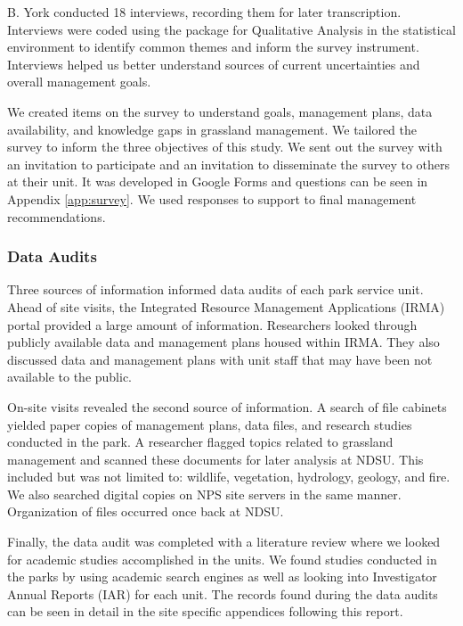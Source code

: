 B. York conducted 18 interviews, recording them for later transcription.
Interviews were coded using the  package for Qualitative Analysis in the \R statistical environment  \citep{rcoreteam2017,huang2018} to identify common themes and inform the survey instrument.
Interviews helped us better understand sources of current uncertainties and overall management goals.

We created items on the survey to understand goals, management plans, data availability, and knowledge gaps in grassland management. 
We tailored the survey to inform the three objectives of this study. 
We sent out the survey with an invitation to participate and an invitation to disseminate the survey to others at their unit. 
It was developed in Google Forms and questions can be seen in Appendix \ref{app:survey}. 
We used responses to support to final management recommendations.

\subsubsection{Data Audits} 
Three sources of information informed data audits of each park service unit. 
Ahead of site visits, the Integrated Resource Management Applications (IRMA) portal provided a large amount of information. 
Researchers looked through publicly available data and management plans housed within IRMA. 
They also discussed data and management plans with unit staff that may have been not available to the public.

On-site visits revealed the second source of information. 
A search of file cabinets yielded paper copies of management plans, data files, and research studies conducted in the park. 
A researcher flagged topics related to grassland management and scanned these documents for later analysis at NDSU. 
This included but was not limited to: wildlife, vegetation, hydrology, geology, and fire. 
We also searched digital copies on NPS site servers in the same manner. Organization of files occurred once back at NDSU.

Finally, the data audit was completed with a literature review where we looked for academic studies accomplished in the units. 
We found studies conducted in the parks by using academic search engines as well as looking into Investigator Annual Reports (IAR) for each unit. 
The records found during the data audits can be seen in detail in the site specific appendices following this report.

